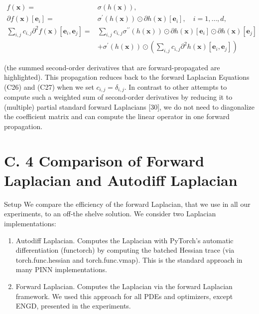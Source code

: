 \documentclass[10pt]{article}
\begin{document}
\begin{align*}
f(\boldsymbol{x})= & \sigma(h(\boldsymbol{x})),  \tag{C34d}\\
\partial f(\boldsymbol{x})\left[\boldsymbol{e}_{i}\right]= & \sigma^{\prime}(h(\boldsymbol{x})) \odot \partial h(\boldsymbol{x})\left[\boldsymbol{e}_{i}\right], \quad i=1, \ldots, d,  \tag{C34e}\\
\sum_{i, j} c_{i, j} \partial^{2} f(\boldsymbol{x})\left[\boldsymbol{e}_{i}, \boldsymbol{e}_{j}\right]= & \sum_{i, j} c_{i, j} \sigma^{\prime \prime}(h(\boldsymbol{x})) \odot \partial h(\boldsymbol{x})\left[\boldsymbol{e}_{i}\right] \odot \partial h(\boldsymbol{x})\left[\boldsymbol{e}_{j}\right] \\
& +\sigma^{\prime}(h(\boldsymbol{x})) \odot\left(\sum_{i, j} c_{i, j} \partial^{2} h(\boldsymbol{x})\left[\boldsymbol{e}_{i}, \boldsymbol{e}_{j}\right]\right) \tag{C34f}
\end{align*}


(the summed second-order derivatives that are forward-propagated are highlighted). This propagation reduces back to the forward Laplacian Equations (C26) and (C27) when we set $c_{i, j}=\delta_{i, j}$. In contrast to other attempts to compute such a weighted sum of second-order derivatives by reducing it to (multiple) partial standard forward Laplacians [30], we do not need to diagonalize the coefficient matrix and can compute the linear operator in one forward propagation.

\section*{C. 4 Comparison of Forward Laplacian and Autodiff Laplacian}
Setup We compare the efficiency of the forward Laplacian, that we use in all our experiments, to an off-the shelve solution. We consider two Laplacian implementations:

\begin{enumerate}
  \item Autodiff Laplacian. Computes the Laplacian with PyTorch's automatic differentiation (functorch) by computing the batched Hessian trace (via torch.func.hessian and torch.func.vmap). This is the standard approach in many PINN implementations.
  \item Forward Laplacian. Computes the Laplacian via the forward Laplacian framework. We used this approach for all PDEs and optimizers, except ENGD, presented in the experiments.
\end{enumerate}
\end{document}
